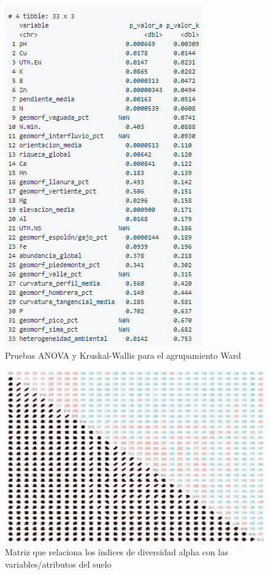\documentclass[11pt,]{article}
\begin{document}
\begin{figure}
\centering
\includegraphics{anova_kruskalwallis_ward.png}
\caption{Pruebas ANOVA y Kruskal-Wallis para el agrupamiento Ward
\label{fig:anova_kruskalwallis_ward}}
\end{figure}

\begin{figure}
\centering
\includegraphics{pearson_indcdiversidad.png}
\caption{Matriz que relaciona los índices de diversidad alpha con las
variables/atributos del suelo \label{fig:pearson_div}}
\end{figure}
\end{document}
